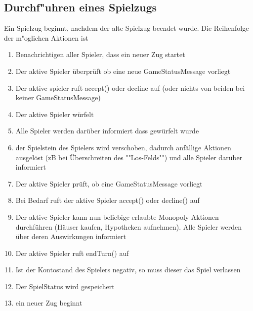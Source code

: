 \documentclass[a4paper,10pt]{article}
\begin{document}
\subsection{Durchf"uhren eines Spielzugs}
Ein Spielzug beginnt, nachdem der alte Spielzug beendet wurde. Die Reihenfolge der m"oglichen Aktionen ist
\begin{enumerate}
\item Benachrichtigen aller Spieler, dass ein neuer Zug startet
\item Der aktive Spieler überprüft ob eine neue GameStatusMessage vorliegt
\item Der aktive spieler ruft accept() oder decline auf (oder nichts von beiden bei keiner GameStatusMessage)
\item Der aktive Spieler würfelt
\item Alle Spieler werden darüber informiert dass gewürfelt wurde
\item der Spielstein des Spielers wird verschoben, dadurch anfällige Aktionen ausgelöst (zB bei Überschreiten des ""Los-Felds"") und alle Spieler darüber informiert
\item Der aktive Spieler prüft, ob eine GameStatusMessage vorliegt
\item Bei Bedarf ruft der aktive Spieler accept() oder decline() auf
\item Der aktive Spieler kann nun beliebige erlaubte Monopoly-Aktionen durchführen (Häuser kaufen, Hypotheken aufnehmen). Alle Spieler werden über deren Auswirkungen informiert
\item Der aktive Spieler ruft endTurn() auf
\item Ist der Kontostand des Spielers negativ, so muss dieser das Spiel verlassen
\item Der SpielStatus wird gespeichert
\item ein neuer Zug beginnt
\end{enumerate}
\end{document}
